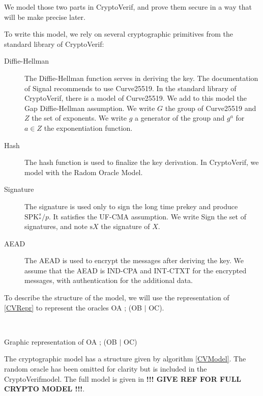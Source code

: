 \documentclass[a4paper, 10pt]{article}
\newcommand{\SPK}[2]{\textrm{SPK}_#1^#2}
\newcommand{\sign}[1]{\textrm{s}#1}
\newcommand{\cv}{CryptoVerif}
\begin{document}
	We model those two parts in \cv, and prove them secure in a way that will be make precise later.

	To write this model, we rely on several cryptographic primitives from the standard library of \cv :
	\begin{description}
		\item[Diffie-Hellman] The Diffie-Hellman function serves in deriving the key. The documentation of Signal recommends to use Curve25519. In the standard library of \cv, there is a model of Curve25519. We add to this model the Gap Diffie-Hellman assumption.
		We write $G$ the group of Curve25519 and $Z$ the set of exponents. We write $g$ a generator of the group and $g^a$ for $a\in Z$ the exponentiation function.
		\item[Hash] The hash function is used to finalize the key derivation. In \cv, we model with the Radom Oracle Model.
		\item[Signature] The signature is used only to sign the long time prekey and produce $\SPK{*}{s/p}$. It satisfies the UF-CMA assumption. We write Sign the set of signatures, and note $\sign{X}$ the signature of $X$.
		\item[AEAD] The AEAD is used to encrypt the messages after deriving the key. We assume that the AEAD is IND-CPA and INT-CTXT for the encrypted messages, with authentication for the additional data.
	\end{description}
	
	To describe the structure of the model, we will use the representation of \ref{CVRepr} to represent the oracles OA ; (OB $\mid$ OC).
	
	\begin{algorithm}[H]
		\
		\label{CVRepr}
		\caption{Graphic representation of OA ; (OB $\mid$ OC)}
	\end{algorithm}
	
	The cryptographic model has a structure given by algorithm \ref{CVModel}. The random oracle has been omitted for clarity but is included in the \cv model. The full model is given in \textbf{!!! GIVE REF FOR FULL CRYPTO MODEL !!!}. %
	
\end{document}

